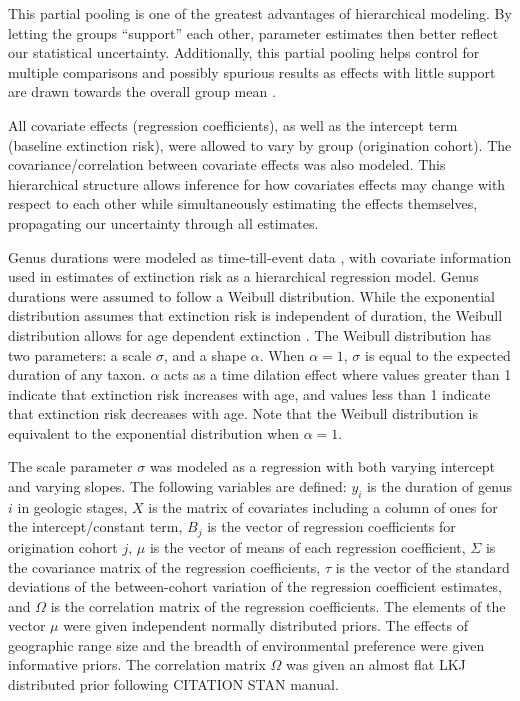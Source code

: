 \documentclass{article}
\begin{document}
This partial pooling is one of the greatest advantages of hierarchical modeling. By letting the groups ``support'' each other, parameter estimates then better reflect our statistical uncertainty. Additionally, this partial pooling helps control for multiple comparisons and possibly spurious results as effects with little support are drawn towards the overall group mean \citep{Gelman2013d,Gelman2007}. 

All covariate effects (regression coefficients), as well as the intercept term (baseline extinction risk), were allowed to vary by group (origination cohort). The covariance/correlation between covariate effects was also modeled. This hierarchical structure allows inference for how covariates effects may change with respect to each other while simultaneously estimating the effects themselves, propagating our uncertainty through all estimates. 

Genus durations were modeled as time-till-event data \citep{Klein2003}, with covariate information used in estimates of extinction risk as a hierarchical regression model. Genus durations were assumed to follow a Weibull distribution. While the exponential distribution assumes that extinction risk is independent of duration, the Weibull distribution allows for age dependent extinction \citep{Klein2003}. The Weibull distribution has two parameters: a scale \(\sigma\), and a shape \(\alpha\). When \(\alpha = 1\), \(\sigma\) is equal to the expected duration of any taxon. \(\alpha\) acts as a time dilation effect where values greater than 1 indicate that extinction risk increases with age, and values less than 1 indicate that extinction risk decreases with age. Note that the Weibull distribution is equivalent to the exponential distribution when \(\alpha = 1\). 

The scale parameter \(\sigma\) was modeled as a regression with both varying intercept and varying slopes. The following variables are defined: \(y_{i}\) is the duration of genus \(i\) in geologic stages, \(X\) is the matrix of covariates including a column of ones for the intercept/constant term, \(B_{j}\) is the vector of regression coefficients for origination cohort \(j\), \(\mu\) is the vector of means of each regression coefficient, \(\Sigma\) is the covariance matrix of the regression coefficients, \(\tau\) is the vector of the standard deviations of the between-cohort variation of the regression coefficient estimates, and \(\Omega\) is the correlation matrix of the regression coefficients. The elements of the vector \(\mu\) were given independent normally distributed priors. The effects of geographic range size and the breadth of environmental preference were given informative priors. The correlation matrix \(\Omega\) was given an almost flat LKJ distributed prior following CITATION STAN manual.
\end{document}
